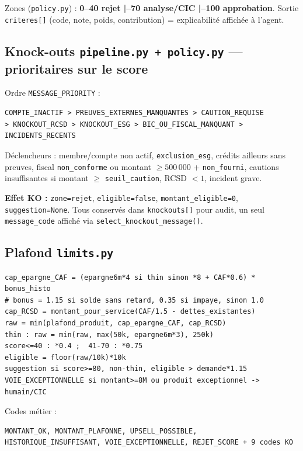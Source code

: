 \documentclass[11pt,a4paper]{article}
\newcommand{\C}[1]{{\small\texttt{\nolinkurl{#1}}}}
\begin{document}
Zones (\texttt{policy.py}) : \textbf{0--40 rejet \enspace|--70 analyse/CIC \enspace|--100 approbation}. Sortie \texttt{criteres[]} (code, note, poids, contribution) = explicabilité affichée à l'agent.

\subsection{Knock-outs \texttt{pipeline.py + policy.py} --- prioritaires sur le score}

Ordre \C{MESSAGE_PRIORITY} :
\begin{lstlisting}
COMPTE_INACTIF > PREUVES_EXTERNES_MANQUANTES > CAUTION_REQUISE
> KNOCKOUT_RCSD > KNOCKOUT_ESG > BIC_OU_FISCAL_MANQUANT > INCIDENTS_RECENTS
\end{lstlisting}

Déclencheurs : membre/compte non actif, \C{exclusion_esg}, crédits ailleurs sans preuves, fiscal \C{non_conforme} ou montant $\geq 500\,000$ + \C{non_fourni}, cautions insuffisantes si montant $\geq$ \C{seuil_caution}, RCSD $<1$, incident grave.

\begin{encadreorange}
\textbf{Effet KO :} \C{zone=rejet}, \C{eligible=false}, \C{montant_eligible=0}, \C{suggestion=None}. Tous conservés dans \C{knockouts[]} pour audit, un seul \C{message_code} affiché via \C{select_knockout_message()}.
\end{encadreorange}

\subsection{Plafond \texttt{limits.py}}

\begin{lstlisting}
cap_epargne_CAF = (epargne6m*4 si thin sinon *8 + CAF*0.6) * bonus_histo
# bonus = 1.15 si solde sans retard, 0.35 si impaye, sinon 1.0
cap_RCSD = montant_pour_service(CAF/1.5 - dettes_existantes)
raw = min(plafond_produit, cap_epargne_CAF, cap_RCSD)
thin : raw = min(raw, max(50k, epargne6m*3), 250k)
score<=40 : *0.4 ;  41-70 : *0.75
eligible = floor(raw/10k)*10k
suggestion si score>=80, non-thin, eligible > demande*1.15
VOIE_EXCEPTIONNELLE si montant>=8M ou produit exceptionnel -> humain/CIC
\end{lstlisting}

Codes métier :
\begin{lstlisting}
MONTANT_OK, MONTANT_PLAFONNE, UPSELL_POSSIBLE,
HISTORIQUE_INSUFFISANT, VOIE_EXCEPTIONNELLE, REJET_SCORE + 9 codes KO
\end{lstlisting}
\end{document}
